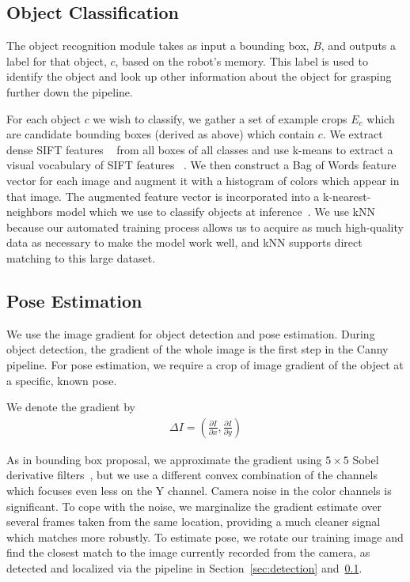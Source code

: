 \documentclass[graybox]{svmult}
\begin{document}
\subsection{Object Classification}
\label{sec:recognition}

The object recognition module takes as input a bounding box, $B$, and
outputs a label for that object, $c$, based on the robot's memory.
This label is used to identify the object and look up other
information about the object for grasping further down the pipeline.

For each object $c$ we wish to classify, we gather a set of example
crops $E_c$ which are candidate bounding boxes (derived as above)
which contain $c$. We extract dense SIFT features ~\citep{lowe99} from
all boxes of all classes and use k-means to extract a visual
vocabulary of SIFT features ~\citep{szeliski10}. We then construct a
Bag of Words feature vector for each image and augment it with a histogram of
colors which appear in that image.  The augmented feature vector is
incorporated into a k-nearest-neighbors model which we use to classify
objects at inference~\citep{szeliski10}. We use kNN because our
automated training process allows us to acquire as much high-quality
data as necessary to make the model work well, and kNN supports direct
matching to this large dataset.  

\subsection{Pose Estimation}

We use the image gradient for object detection and pose
estimation. During object detection, the gradient of the whole image
is the first step in the Canny pipeline.  For pose estimation, we
require a crop of image gradient of the object at a specific, known
pose.

We denote the gradient by
\begin{align}
\Delta I = \left( \frac{\partial I}{\partial x}, \frac{\partial I}{\partial y} \right)
\end{align}

As in bounding box proposal, we approximate the gradient using $5
\times 5$ Sobel derivative filters~\citep{sobel95}, but we use a
different convex combination of the channels which focuses even less
on the Y channel.  Camera noise in the color channels is
significant. To cope with the noise, we marginalize the gradient
estimate over several frames taken from the same location, providing a
much cleaner signal which matches more robustly.  To estimate pose, we
rotate our training image and find the closest match to the image
currently recorded from the camera, as detected and localized via the
pipeline in Section~\ref{sec:detection} and~\ref{sec:recognition}.
\end{document}
